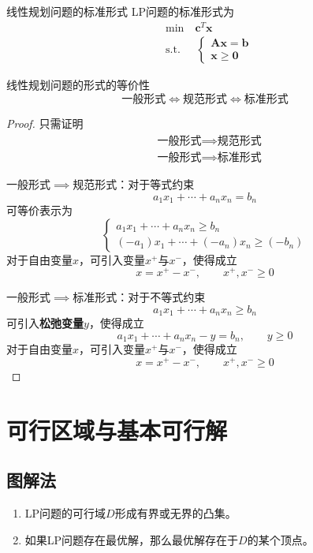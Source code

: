 \documentclass[lang = cn, scheme = chinese, thmcnt = section]{elegantbook}
\newcommand{\bs}{\boldsymbol}          %
\begin{document}
\begin{definition}{线性规划问题的标准形式}
	LP问题的标准形式为
	\begin{align*}\label{线性规划问题的标准形式}
		& \text{min}  \quad \bs{c}^T\bs{x}\\
		& \text{s.t.} \;\, \quad \begin{cases}
			\bs{A} \bs{x} = \bs{b}\\
			\bs{x} \ge \bs{0}
		\end{cases}\tag{***}
	\end{align*}
\end{definition}

\begin{theorem}{线性规划问题的形式的等价性}
	$$
	\text{一般形式} \iff
	\text{规范形式} \iff
	\text{标准形式}
	$$
\end{theorem}

\begin{proof}
	只需证明
	\begin{align*}
		& \text{一般形式}\implies\text{规范形式}\\
		& \text{一般形式}\implies\text{标准形式}
	\end{align*}

	一般形式$\implies$规范形式：对于等式约束
	$$
	a_1 x_1 + \cdots + a_n x_n = b_n
	$$
	可等价表示为
	$$
	\begin{cases}
		a_1 x_1 + \cdots + a_n x_n \ge b_n\\
		(-a_1) x_1 + \cdots + (-a_n) x_n \ge (-b_n)
	\end{cases}
	$$
	对于自由变量$x$，可引入变量$x^+$与$x^-$，使得成立
	$$
	x=x^+-x^-,\qquad 
	x^+,x^-\ge 0
	$$
	
	一般形式$\implies$标准形式：对于不等式约束
	$$
	a_1 x_1 + \cdots + a_n x_n \ge b_n
	$$
	可引入{\bf{松弛变量}}$y$，使得成立
	$$
	a_1 x_1 + \cdots + a_n x_n - y = b_n,\qquad 
	y\ge 0
	$$
	对于自由变量$x$，可引入变量$x^+$与$x^-$，使得成立
	$$
	x=x^+-x^-,\qquad 
	x^+,x^-\ge 0
	$$
\end{proof}

\section{可行区域与基本可行解}

\subsection{图解法}

\begin{theorem}
	\begin{enumerate}
		\item LP问题的可行域$D$形成有界或无界的凸集。
		\item 如果LP问题存在最优解，那么最优解存在于$D$的某个顶点。
	\end{enumerate}
\end{theorem}
\end{document}
